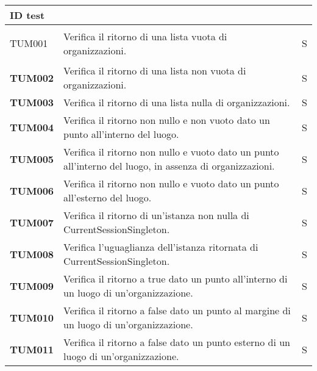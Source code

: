 \documentclass[../piano-di-qualifica.tex]{subfiles}
\begin{document}
\renewcommand{\arraystretch}{2}
\begin{longtable}[H]{>{\centering\bfseries}m{3cm} >{}m{10cm} >{\centering\arraybackslash}m{3cm}}
  \rowcolor{darkgray!90!}
  \color{white}
  {\textbf{ID test}} & \color{white}{\textbf{Metodo}}                                    & \color{white}{\textbf{Esito}} \\
  \endhead\rowcolor{white}%
  \multicolumn{3}{r}{\textit{Continua alla pagina seguente}}
  \endfoot%
  \endlastfoot%



  TUM001             & Verifica il ritorno di una lista vuota di organizzazioni. & S\\

  TUM002             & Verifica il ritorno di una lista non vuota di organizzazioni. & S\\

  TUM003             & Verifica il ritorno di una lista nulla di organizzazioni. & S\\

  TUM004             & Verifica il ritorno non nullo e non vuoto dato un punto all'interno del luogo. & S\\

  TUM005             & Verifica il ritorno non nullo e vuoto dato un punto all'interno del luogo, in assenza di organizzazioni. & S\\

  TUM006             & Verifica il ritorno non nullo e vuoto dato un punto all'esterno del luogo. & S\\

  TUM007             & Verifica il ritorno di un'istanza non nulla di CurrentSessionSingleton. & S\\

  TUM008             & Verifica l'uguaglianza dell'istanza ritornata di CurrentSessionSingleton. & S\\

  TUM009             & Verifica il ritorno a true dato un punto all'interno di un luogo di un'organizzazione. & S\\

  TUM010             & Verifica il ritorno a false dato un punto al margine di un luogo di un'organizzazione. & S\\

  TUM011             & Verifica il ritorno a false dato un punto esterno di un luogo di un'organizzazione. & S\\


\end{longtable}
\end{document}
